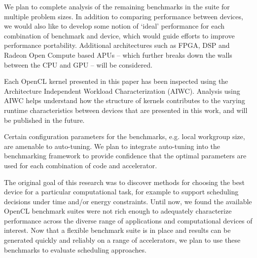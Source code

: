 \documentclass[../document.tex]{subfiles}
\begin{document}
\label{sec:future_work}

We plan to complete analysis of the remaining benchmarks in the suite for multiple problem sizes.
In addition to comparing performance between devices, we would also like to develop some notion of `ideal' performance for each combination of benchmark and device, which would guide efforts to improve performance portability.
Additional architectures such as FPGA, DSP and Radeon Open Compute based APUs -- which further breaks down the walls between the CPU and GPU -- will be considered.

Each OpenCL kernel presented in this paper has been inspected using the Architecture Independent Workload Characterization (AIWC).
Analysis using AIWC helps understand how the structure of kernels contributes to the varying runtime characteristics between devices that are presented in this work, and will be published in the future.

Certain configuration parameters for the benchmarks, e.g. local workgroup size, are amenable to auto-tuning.
We plan to integrate auto-tuning into the benchmarking framework to provide confidence that the optimal parameters are used for each combination of code and accelerator.

The original goal of this research was to discover methods for choosing the best device for a particular computational task, for example to support scheduling decisions under time and/or energy constraints.
Until now, we found the available OpenCL benchmark suites were not rich enough to adequately characterize performance across the diverse range of applications and computational devices of interest.
Now that a flexible benchmark suite is in place and results can be generated quickly and reliably on a range of accelerators, we plan to use these benchmarks to evaluate scheduling approaches.
\end{document}
